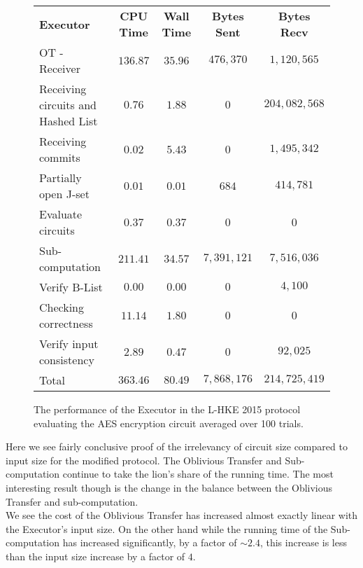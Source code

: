 \documentclass[ %
                    author={Nicholas Tutte},
                supervisor={Prof. Nigel Smart},
                    degree={MEng},
                     title={Secure Two Party Computation},
                  subtitle={A practical comparison of recent protocols},
                      type={Research - GG1K},
                      year={2015} ]{dissertation}
\begin{document}
				\begin{figure}[!ht]
					\begin{tabular}{| p{4.3cm} | c c c c |}
						\hline
						\textbf{Executor} & \textbf{CPU Time} & \textbf{Wall Time} & \textbf{Bytes Sent} & \textbf{Bytes Recv} \\
						\thickhline
						OT - Receiver & $136.87$ & $35.96$ & $476,370$ & $1,120,565$ \\
						\hline
						Receiving circuits and Hashed List & $0.76$ & $1.88$ & $0$ & $204,082,568$ \\
						\hline
						Receiving commits & $0.02$ & $5.43$ & $0$ & $1,495,342$ \\
						\hline
						Partially open J-set & $0.01$ & $0.01$ & $684$ & $414,781$ \\
						\hline
						Evaluate circuits & $0.37$ & $0.37$ & $0$ & $0$ \\
						\hline
						Sub-computation & $211.41$ & $34.57$ & $7,391,121$ & $7,516,036$ \\
						\hline
						Verify B-List & $0.00$ & $0.00$ & $0$ & $4,100$ \\
						\hline
						Checking correctness & $11.14$ & $1.80$ & $0$ & $0$ \\
						\hline
						Verify input consistency & $2.89$ & $0.47$ & $0$ & $92,025$ \\
						\thickhline
						Total & $363.46$ & $80.49$ & $7,868,176$ & $214,725,419$ \\
						\hline
					\end{tabular}
					\caption{The performance of the Executor in the L-HKE 2015 protocol evaluating the AES encryption circuit averaged over 100 trials. \label{table:L-HKE_2015_AES_Executor}}
				\end{figure}
				\FloatBarrier

				Here we see fairly conclusive proof of the irrelevancy of circuit size compared to input size for the modified protocol. The Oblivious Transfer and Sub-computation continue to take the lion's share of the running time. The most interesting result though is the change in the balance between the Oblivious Transfer and sub-computation.\\

				We see the cost of the Oblivious Transfer has increased almost exactly linear with the Executor's input size. On the other hand while the running time of the Sub-computation has increased significantly, by a factor of $\sim 2.4$, this increase is less than the input size increase by a factor of $4$.\\
\end{document}
